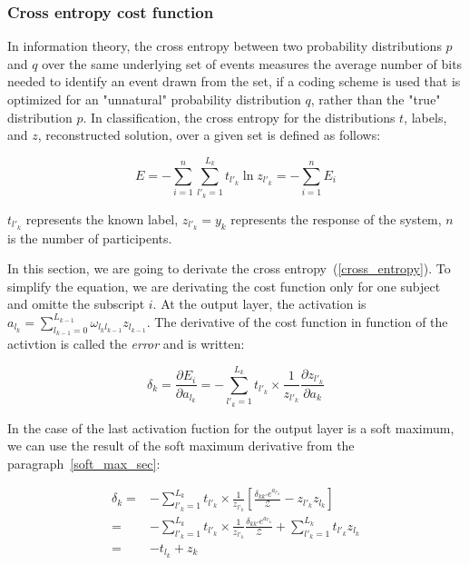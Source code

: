 \documentclass[final, paper=letter,5p,times,twocolumn]{elsarticle}
\begin{document}
\subsubsection{Cross entropy cost function}
\label{Cross_entropy_cost_function_sec}

In information theory, the cross entropy between two probability distributions $p$ and $q$ over the same underlying set of events measures the average number of bits needed to identify an event drawn from the set, if a coding scheme is used that is optimized for an "unnatural" probability distribution $q$, rather than the "true" distribution $p$. In classification, the cross entropy for the distributions $t$, labels, and $z$, reconstructed solution, over a given set is defined as follows:

\begin{equation}
  E = - \sum_{i = 1}^{n}\sum_{l'_{k} = 1}^{L_{k}} t_{l'_{k}} \ln z_{l'_{k}} =  - \sum_{i = 1}^{n} E_{i}
  \label{cross_entropy}
\end{equation}

$t_{l'_{k}}$ represents the known label, $z_{l'_{k}} = y_{k}$ represents the response of the system, $n$ is the number of participents. 

In this section, we are going to derivate the cross entropy~(\ref{cross_entropy}). To simplify the equation, we are derivating the cost function only for one subject and omitte the subscript $i$. At the output layer, the activation is $a_{l_{k}} = \sum_{l_{k-1} = 0}^{L_{k-1}} \omega_{l_{k}l_{k-1}} z_{l_{k-1}}$. The derivative of the cost function in function of the activtion is called the {\it error} and is written:

\begin{equation}
  \delta_{k} = \frac{\partial E_{i}}{\partial a_{l_{k}}} = - \sum_{l'_{k} = 1}^{L_{k}} t_{l'_{k}} \times \frac{1}{z_{l'_{k}}} \frac{\partial z_{l'_{k}}}{\partial a_{k}}
  \label{cost_function_error}
\end{equation}

In the case of the last activation fuction for the output layer is a soft maximum, we can use the result of the soft maximum derivative from the paragraph~\ref{soft_max_sec}:

\begin{equation*}
  \begin{split}
    \delta_{k} = & - \sum_{l'_{k} = 1}^{L_{k}} t_{l'_{k}} \times \frac{1}{z_{l'_{k}}} \left \lbrack  \frac{\delta_{kk'} e^{a_{l'_{k}}}}{\mathcal{Z}} - z_{l'_{k}}z_{l_{k}} \right \rbrack \\
    = & - \sum_{l'_{k} = 1}^{L_{k}} t_{l'_{k}} \times \frac{1}{z_{l'_{k}}} \frac{\delta_{kk'} e^{a_{l'_{k}}}}{\mathcal{Z}} +  \sum_{l'_{k} = 1}^{L_{k}} t_{l'_{k}} z_{l_{k}} \\
    = & - t_{l_{k}} +  z_{k} \\
  \end{split}
\end{equation*}
\end{document}
